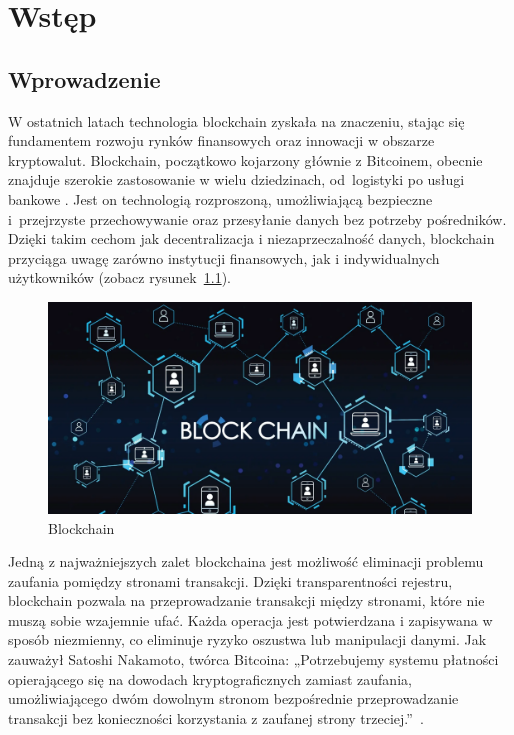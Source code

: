 \chapter{Wstęp}

\section{Wprowadzenie}

W ostatnich latach technologia blockchain zyskała na znaczeniu, stając się fundamentem rozwoju rynków finansowych oraz innowacji w obszarze kryptowalut. Blockchain, początkowo kojarzony głównie z Bitcoinem, obecnie znajduje szerokie zastosowanie w wielu dziedzinach, od~logistyki po usługi bankowe \cite{advanced_blockchain_technology}. Jest on technologią rozproszoną, umożliwiającą bezpieczne i~przejrzyste przechowywanie oraz przesyłanie danych bez potrzeby pośredników. Dzięki takim cechom jak decentralizacja i niezaprzeczalność danych, blockchain przyciąga uwagę zarówno instytucji finansowych, jak i indywidualnych użytkowników (zobacz rysunek~\ref{fig:Blockchain}).
\begin{figure}[htb]
    \centering
    \includegraphics[width=0.8\linewidth]{./obrazy/blockchain}
    \caption{Blockchain}
    \label{fig:Blockchain}
\end{figure}

Jedną z najważniejszych zalet blockchaina jest możliwość eliminacji problemu zaufania pomiędzy stronami transakcji. Dzięki transparentności rejestru, blockchain pozwala na przeprowadzanie transakcji między stronami, które nie muszą sobie wzajemnie ufać. Każda operacja jest potwierdzana i zapisywana w sposób niezmienny, co eliminuje ryzyko oszustwa lub manipulacji danymi. Jak zauważył Satoshi Nakamoto, twórca Bitcoina: „Potrzebujemy systemu płatności opierającego się na dowodach kryptograficznych zamiast zaufania, umożliwiającego dwóm dowolnym stronom bezpośrednie przeprowadzanie transakcji bez konieczności korzystania z zaufanej strony trzeciej.”~\cite{nakamoto_2008}.

